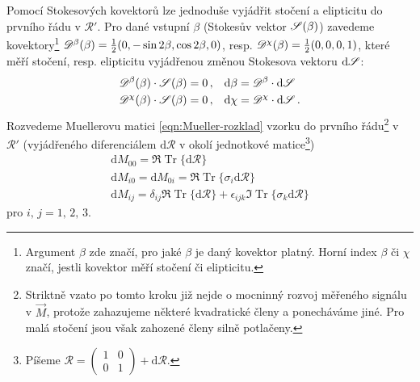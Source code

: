Pomocí Stokesových kovektorů lze jednoduše vyjádřit stočení a elipticitu do prvního řádu v $\mathcal{R}'$.
Pro dané vstupní $\beta$ (Stokesův vektor $\mathscr{S}(\beta)$) zavedeme kovektory\footnote{Argument $\beta$ zde značí, pro jaké $\beta$ je daný kovektor platný. Horní index $\beta$ či $\chi$ značí, jestli kovektor měří stočení či elipticitu.} $\mathscr{D}^\beta(\beta)=\frac{1}{2}(0, -\sin2\beta, \cos2\beta, 0)$, resp. $\mathscr{D}^\chi(\beta)=\frac{1}{2}(0, 0, 0, 1)$, které měří stočení, resp. elipticitu vyjádřenou změnou Stokesova vektoru $\textrm{d}\mathscr{S}$:
\begin{align}
    \mathscr{D}^\beta(\beta) \cdot \mathscr{S}(\beta) = 0 \,, \quad &\textrm{d}\beta = \mathscr{D}^\beta \cdot \textrm{d}\mathscr{S} \\
    \mathscr{D}^\chi(\beta) \cdot \mathscr{S}(\beta) = 0 \,, \quad &\textrm{d}\chi = \mathscr{D}^\chi \cdot \textrm{d}\mathscr{S} \,.
\end{align}
Rozvedeme Muellerovu matici \eqref{eqn:Mueller-rozklad} vzorku do prvního řádu\footnote{Striktně vzato po tomto kroku již nejde o mocninný rozvoj měřeného signálu v $\vec{M}$, protože zahazujeme některé kvadratické členy a ponecháváme jiné.
Pro malá stočení jsou však zahozené členy silně potlačeny.} v $\mathcal{R}'$ (vyjádřeného diferenciálem $\textrm{d}\mathcal{R}$ v okolí jednotkové matice\footnote{Píšeme $\mathcal{R}= \begin{pmatrix} 1&0\\0&1 \end{pmatrix} + \textrm{d}\mathcal{R}$.}) 
\begin{align}
\label{eqn:dif-Mueller}
\textrm{d}M_{00} = \Re \operatorname{Tr} \lbrace\textrm{d}\mathcal{R} \rbrace\\
    \textrm{d}M_{i0} = \textrm{d}M_{0i} = \Re \operatorname{Tr} \lbrace \sigma_i \textrm{d}\mathcal{R} \rbrace \\
    \textrm{d}M_{ij} = \delta_{ij} \Re\operatorname{Tr}\lbrace\textrm{d}\mathcal{R}\rbrace + \epsilon_{ijk} \Im\operatorname{Tr}\lbrace\sigma_k\textrm{d}\mathcal{R}\rbrace
\end{align}
pro $i,\,j = 1,\,2,\,3$.


